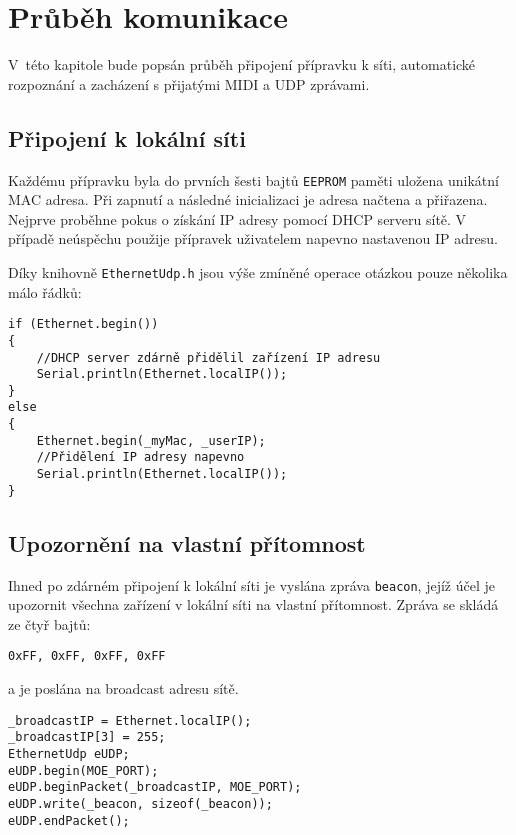 \chapter{Průběh komunikace}
V~této kapitole bude popsán průběh připojení přípravku k síti, automatické rozpoznání a zacházení s přijatými \acs{MIDI} a UDP zprávami.

\section{Připojení k lokální síti}
Každému přípravku byla do prvních šesti bajtů \texttt{EEPROM} paměti uložena unikátní MAC adresa. Při zapnutí a následné inicializaci je adresa načtena a přiřazena. Nejprve proběhne pokus o získání IP adresy pomocí DHCP serveru sítě. V případě neúspěchu použije přípravek uživatelem napevno nastavenou IP adresu. 

Díky knihovně \texttt{EthernetUdp.h} jsou výše zmíněné operace otázkou pouze několika málo řádků:
\begin{lstlisting}
if (Ethernet.begin())
{
    //DHCP server zdárně přidělil zařízení IP adresu
    Serial.println(Ethernet.localIP());
}
else
{
    Ethernet.begin(_myMac, _userIP);
    //Přidělení IP adresy napevno
    Serial.println(Ethernet.localIP());
}
\end{lstlisting}


\newcommand{\bytes}[4]{
    \begin{center}
        \large{\texttt{0x#1, 0x#2, 0x#3, 0x#4}}
    \end{center}
}



\section{Upozornění na vlastní přítomnost}
Ihned po zdárném připojení k lokální síti je vyslána zpráva  \texttt{beacon}, jejíž účel je upozornit všechna zařízení v lokální síti na vlastní přítomnost. Zpráva se skládá ze čtyř bajtů:
\bytes{FF}{FF}{FF}{FF}
a je poslána na broadcast adresu sítě.

\begin{lstlisting}
_broadcastIP = Ethernet.localIP();
_broadcastIP[3] = 255;
EthernetUdp eUDP;
eUDP.begin(MOE_PORT);
eUDP.beginPacket(_broadcastIP, MOE_PORT);
eUDP.write(_beacon, sizeof(_beacon));
eUDP.endPacket();
\end{lstlisting}

